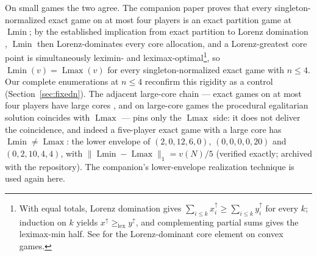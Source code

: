\documentclass[11pt]{article}
\newcommand{\Lmin}{\operatorname{Lmin}}
\newcommand{\Lmax}{\operatorname{Lmax}}
\begin{document}
On small games the two agree.  The companion paper \citep{Flanagan2026}
proves that every singleton-normalized exact game on at most four players is
an exact partition game at $\Lmin$; by the established implication from exact
partition to Lorenz domination \citep{LlerenaMauri2017}, $\Lmin$ then
Lorenz-dominates every core allocation, and a Lorenz-greatest core point is
simultaneously leximin- and leximax-optimal\footnote{With equal totals,
Lorenz domination gives $\sum_{i\le k}x^{\uparrow}_i\ge
\sum_{i\le k}y^{\uparrow}_i$ for every $k$; induction on $k$ yields
$x^{\uparrow}\ge_{\mathrm{lex}}y^{\uparrow}$, and complementing partial
sums gives the leximax-min half.  See \citet{DuttaRay1989} for the
Lorenz-dominant core element on convex games.}, so
$\Lmin(v)=\Lmax(v)$ for every singleton-normalized exact game with $n\le4$.
Our complete enumerations at $n\le4$ reconfirm this rigidity as a control
(Section~\ref{sec:fixedn}).  The adjacent large-core chain --- exact games on
at most four players have large cores \citep{Biswas1999}, and on large-core
games the procedural egalitarian solution coincides with $\Lmax$
\citep{Dietzenbacher2021,ArinKuipersVermeulen2003} --- pins only the $\Lmax$
side: it does not deliver the coincidence, and indeed a five-player exact
game with a large core has $\Lmin\ne\Lmax$: the lower envelope of
$(2,0,12,6,0)$, $(0,0,0,0,20)$ and $(0,2,10,4,4)$, with
$\|\Lmin-\Lmax\|_1=v(N)/5$ (verified exactly; archived with the
repository).  The companion's lower-envelope realization technique is
used again here.
\end{document}
